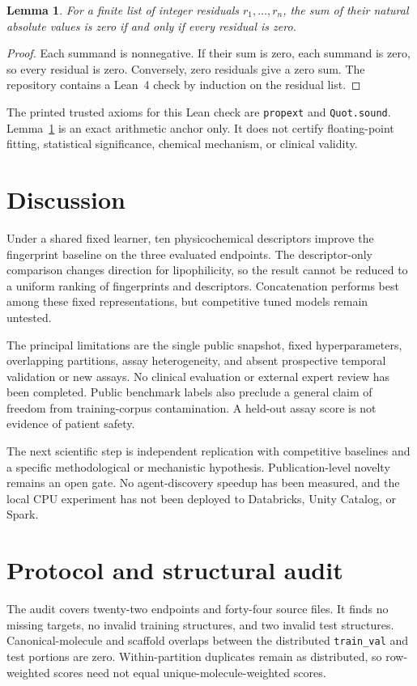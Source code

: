 \documentclass[10pt,twocolumn,a4paper]{article}
\newtheorem{lemma}{Lemma}
\theoremstyle{definition}\newtheorem{observation}{Numerical observation}
\theoremstyle{remark}\newtheorem{remark}{Remark}
\newcommand{\code}[1]{\texttt{\small #1}}
\begin{document}
\begin{lemma}\label{lem:zero}
For a finite list of integer residuals $r_1,\ldots,r_n$, the sum of their natural absolute values is zero if and only if every residual is zero.
\end{lemma}
\begin{proof}
Each summand is nonnegative. If their sum is zero, each summand is zero, so every residual is zero. Conversely, zero residuals give a zero sum. The repository contains a Lean~4 check by induction on the residual list.
\end{proof}
The printed trusted axioms for this Lean check are \code{propext} and \code{Quot.sound}. Lemma~\ref{lem:zero} is an exact arithmetic anchor only. It does not certify floating-point fitting, statistical significance, chemical mechanism, or clinical validity.

\section{Discussion}\label{sec:discussion}
Under a shared fixed learner, ten physicochemical descriptors improve the fingerprint baseline on the three evaluated endpoints. The descriptor-only comparison changes direction for lipophilicity, so the result cannot be reduced to a uniform ranking of fingerprints and descriptors. Concatenation performs best among these fixed representations, but competitive tuned models remain untested.

The principal limitations are the single public snapshot, fixed hyperparameters, overlapping partitions, assay heterogeneity, and absent prospective temporal validation or new assays. No clinical evaluation or external expert review has been completed. Public benchmark labels also preclude a general claim of freedom from training-corpus contamination. A held-out assay score is not evidence of patient safety.

The next scientific step is independent replication with competitive baselines and a specific methodological or mechanistic hypothesis. Publication-level novelty remains an open gate. No agent-discovery speedup has been measured, and the local CPU experiment has not been deployed to Databricks, Unity Catalog, or Spark.

\appendix
\section{Protocol and structural audit}\label{app:protocol}
The audit covers twenty-two endpoints and forty-four source files. It finds no missing targets, no invalid training structures, and two invalid test structures. Canonical-molecule and scaffold overlaps between the distributed \code{train\_val} and test portions are zero. Within-partition duplicates remain as distributed, so row-weighted scores need not equal unique-molecule-weighted scores.
\end{document}
